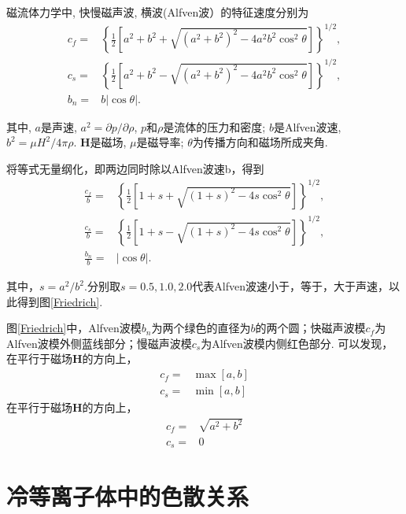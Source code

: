 \documentclass[landscape]{article}
\begin{document}
	磁流体力学中, 快慢磁声波, 横波(Alfven波）的特征速度分别为\citep{Jeffrey1964}
    \begin{align}
        c_f =& \left\{\frac{1}{2} \left[a^2 + b^2 + \sqrt{(a^2 + b^2)^2 - 4 a^2 b^2
			\cos^2\theta}\right]\right\}^{1/2},
		\\
		c_s =& \left\{\frac{1}{2} \left[a^2 + b^2 - \sqrt{(a^2 + b^2)^2 - 4 a^2 b^2
			\cos^2\theta}\right]\right\}^{1/2},
		\\
		b_n =& b \left|\cos\theta\right|.
    \end{align}
	
	其中, $a$是声速, $a^2 = \partial p / \partial \rho$, $p$和$\rho$是流体的压力和密度;
	$b$是Alfven波速, $b^2 = \mu H^2 / 4 \pi \rho$. $\boldsymbol{H}$是磁场, $\mu$是磁导率;
	$\theta$为传播方向和磁场所成夹角.
	
    将等式无量纲化，即两边同时除以Alfven波速b，得到
    \begin{align}
		\frac{c_f}{b} =& \left\{\frac{1}{2} \left[1 + s + \sqrt{(1 + s)^2 - 4 s
			\cos^2\theta}\right]\right\}^{1/2},
		\\
		\frac{c_s}{b} =& \left\{\frac{1}{2} \left[1 + s - \sqrt{(1 + s)^2 - 4 s
			\cos^2\theta}\right]\right\}^{1/2},
		\\
		\frac{b_n}{b} =& \left|\cos\theta\right|.
	\end{align}	

    其中，$s=a^2/b^2$.分别取$s=0.5,1.0,2.0$代表Alfven波速小于，等于，大于声速，以此得到图\ref{Friedrich}.
    
    图\ref{Friedrich}中，Alfven波模$b_n$为两个绿色的直径为$b$的两个圆；快磁声波模$c_f$为Alfven波模外侧蓝线部分；慢磁声波模$c_s$为Alfven波模内侧红色部分.
    可以发现，在平行于磁场$\boldsymbol{H}$的方向上，
    \begin{align}
      c_f = & \max\left[a , b\right] \\
      c_s = & \min\left[a , b\right]
    \end{align}
    在平行于磁场$\boldsymbol{H}$的方向上，
    \begin{align}
      c_f = & \sqrt{a^2 + b^2} \\
      c_s = & 0
    \end{align}
    
	
	
	\section{冷等离子体中的色散关系}
	
\end{document}
